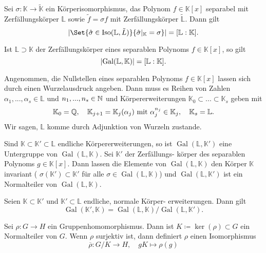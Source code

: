 \documentclass{cheat-sheet}
\newcommand{\K}{\mathbb{K}} %
\renewcommand{\L}{\mathbb{L}} %
\DeclareMathOperator{\Iso}{Iso} %
\DeclareMathOperator{\Gal}{Gal} %
\begin{document}

\begin{satz}
  Sei $\sigma : \K \to \tilde{\K}$ ein Körperisomorphismus, das Polynom $f \in \K[x]$ separabel mit Zerfällungskörper $\L$ sowie $\tilde{f} = \sigma f$ mit Zerfällungskörper $\tilde{\L}$. Dann gilt
  \[ \abs{\Set{ \hat{\sigma} \in \Iso(\L, \tilde{L}) }{ \hat{\sigma}|_{\K} = \sigma }} = [\L : \K]. \]
\end{satz}

\begin{kor}
  Ist $\L \supset \K$ der Zerfällungskörper eines separablen Polynoms $f \in \K[x]$, so gilt
  \[ \abs{\Gal(\L, \K)} = [\L : \K]. \]
\end{kor}



\begin{bem}
  Angenommen, die Nullstellen eines separablen Polynoms $f \in \K[x]$ lassen sich durch einen Wurzelausdruck angeben. Dann muss es Reihen von Zahlen $\alpha_1, ..., \alpha_s \in \L$ und $n_1, ..., n_s \in \mathbb{N}$ und Körpererweiterungen $\K_0 \subset ... \subset \K_s$ geben mit
  \[
    \K_0 = \Q, \quad
    \K_{j+1} = \K_j(\alpha_j) \text{ mit } \alpha_j^{n_j} \in \K_j, \quad
    \K_s = \L.
  \]
  Wir sagen, $\L$ komme durch Adjunktion von Wurzeln zustande.
\end{bem}

\begin{lem}
  Sind $\K \subset \K' \subset \L$ endliche Körpererweiterungen, so ist $\Gal(\L, \K')$ eine Untergruppe von $\Gal(\L, \K)$. Sei $\K'$ der Zerfällungs- körper des separablen Polynoms $g \in \K[x]$. Dann lassen die Elemente von $\Gal(\L, \K)$ den Körper $\K$ invariant (\dh{} $\sigma(\K') \subset \K'$ für alle $\sigma \in \Gal(\L, \K)$) und $\Gal(\L, \K')$ ist ein Normalteiler von $\Gal(\L, \K)$.
\end{lem}

\begin{lem}
  Seien $\K \subset \K'$ und $\K' \subset \L$ endliche, normale Körper- erweiterungen. Dann gilt
  \[ \Gal(\K', \K) = \Gal(\L, \K) / \Gal(\L, \K'). \]
\end{lem}

\begin{lem}
  Sei $\rho : G \to H$ ein Gruppenhomomorphismus. Dann ist $K \coloneqq \ker(\rho) \subset G$ ein Normalteiler von $G$. Wenn $\rho$ surjektiv ist, dann definiert $\rho$ einen Isomorphismus
  \[ \overline{\rho} : G / K \to H, \quad gK \mapsto \rho(g) \]
\end{lem}
\end{document}
